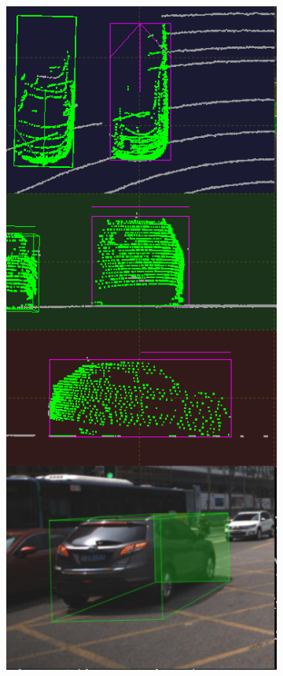 \documentclass[letterpaper, 10 pt, conference]{ieeeconf}  %
\begin{document}
\begin{figure}[th]
\begin{subfigure}{0.16\linewidth}
		\includegraphics[scale=0.12]{./figures/transfer/car-1}
		\caption{}
	\end{subfigure}
	~
	\begin{subfigure}{0.16\linewidth}

\end{subfigure}
\end{figure}
\end{document}
